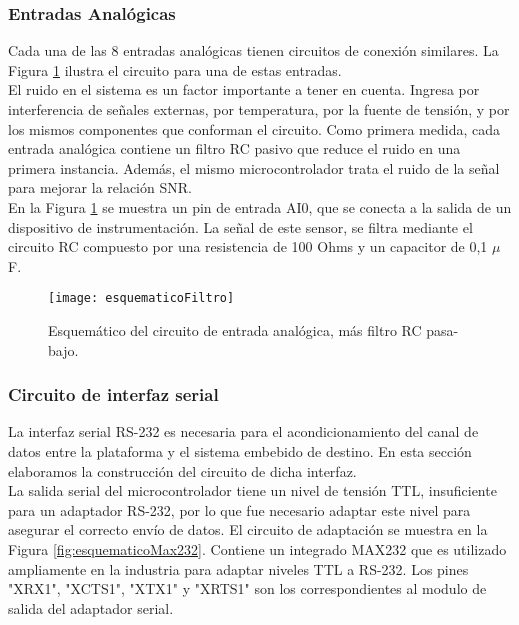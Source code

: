 \subsubsection{Entradas Analógicas}
\label{it3:ssub:entradas_analogicas}

Cada una de las 8 entradas analógicas tienen circuitos de conexión similares. La Figura \ref{fig:esquematicoFiltro} ilustra el circuito para una de estas entradas. \\

El ruido en el sistema es un factor importante a tener en cuenta. Ingresa por interferencia de señales externas, por temperatura, por la fuente de tensión, y por los mismos componentes que conforman el circuito. Como primera medida, cada entrada analógica contiene un filtro RC pasivo que reduce el ruido en una primera instancia. Además, el mismo microcontrolador trata el ruido de la señal para mejorar la relación SNR. \\

En la Figura \ref{fig:esquematicoFiltro} se muestra un pin de entrada AI0, que se conecta a la salida de un dispositivo de instrumentación. La señal de este sensor, se filtra mediante el circuito RC compuesto por una resistencia de 100 Ohms y un capacitor de 0,1 $\mu$F.

\begin{figure}[H]
  \centering
  \texttt{[image: esquematicoFiltro]}
  \caption{Esquemático del circuito de entrada analógica, más filtro RC pasa-bajo.}\label{fig:esquematicoFiltro}
\end{figure}


\subsubsection{Circuito de interfaz serial}
\label{it3:ssub:circuito_de_interfaz_serial}

La interfaz serial RS-232 es necesaria para el acondicionamiento del canal de datos entre la plataforma y el sistema embebido de destino. En esta sección elaboramos la construcción del circuito de dicha interfaz. \\

La salida serial del microcontrolador tiene un nivel de tensión TTL, insuficiente para un adaptador RS-232, por lo que fue necesario adaptar este nivel para asegurar el correcto envío de datos. El circuito de adaptación se muestra en la Figura \ref{fig:esquematicoMax232}. Contiene un integrado MAX232 que es utilizado ampliamente en la industria para adaptar niveles TTL a RS-232. Los pines "XRX1", "XCTS1", "XTX1" y "XRTS1" son los correspondientes al modulo de salida del adaptador serial. \\

